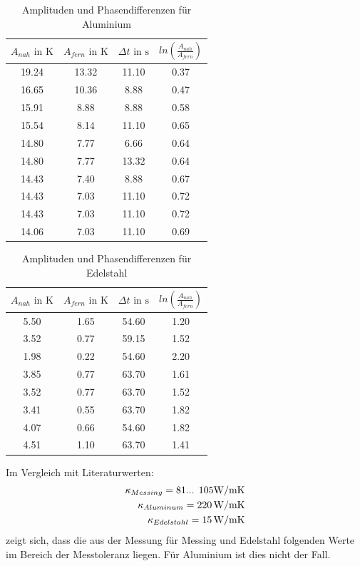 \begin{table}[b]
  \centering
  \caption{Amplituden und Phasendifferenzen für Aluminium}
  \label{tab:Alu}
  \begin{tabular}{c c c c}
    \toprule
    $A_{nah} \text{ in } \si{\kelvin}$ & $A_{fern} \text{ in } \si{\kelvin}$ & $\Delta t \text{ in } \si{\second}$ & $ ln(\frac{A_{nah}}{A_{fern}}) $ \\
    \midrule
    19.24 & 13.32 & 11.10 & 0.37 \\
    16.65 & 10.36 & 8.88 & 0.47 \\
    15.91 & 8.88 & 8.88 & 0.58 \\
    15.54 & 8.14 & 11.10 & 0.65 \\
    14.80 & 7.77 & 6.66 & 0.64 \\
    14.80 & 7.77 & 13.32 & 0.64 \\
    14.43 & 7.40 & 8.88 & 0.67 \\
    14.43 & 7.03 & 11.10 & 0.72 \\
    14.43 & 7.03 & 11.10 & 0.72 \\
    14.06 & 7.03 & 11.10 & 0.69 \\
    \bottomrule
  \end{tabular}
\end{table}

\begin{table}[b]
  \centering
  \caption{Amplituden und Phasendifferenzen für Edelstahl}
  \label{tab:Edelstahl}
  \begin{tabular}{c c c c}
    \toprule
    $A_{nah} \text{ in } \si{\kelvin}$ & $A_{fern} \text{ in } \si{\kelvin}$ & $\Delta t \text{ in } \si{\second}$ & $ln(\frac{A_{nah}}{A_{fern}})$\\
    \midrule
    5.50 & 1.65 & 54.60 & 1.20 \\
    3.52 & 0.77 & 59.15 & 1.52 \\
    1.98 & 0.22 & 54.60 & 2.20 \\
    3.85 & 0.77 & 63.70 & 1.61 \\
    3.52 & 0.77 & 63.70 & 1.52 \\
    3.41 & 0.55 & 63.70 & 1.82 \\
    4.07 & 0.66 & 54.60 & 1.82 \\
    4.51 & 1.10 & 63.70 & 1.41 \\
    \bottomrule
  \end{tabular}
\end{table}

Im Vergleich mit Literaturwerten:
\begin{equation*}
  \begin{split}
    \kappa_{Messing} = \num{81}\text{... }\num{105}\si{\watt\per{\metre\kelvin}} \\
    \kappa_{Aluminum} = \SI{220}{\watt\per{\metre\kelvin}} \\
    \kappa_{Edelstahl} = \SI{15}{\watt\per{\metre\kelvin}}
  \end{split}
\end{equation*}
zeigt sich, dass die aus der Messung für Messing und Edelstahl folgenden Werte im Bereich der Messtoleranz liegen. Für Aluminium ist dies nicht der Fall.

